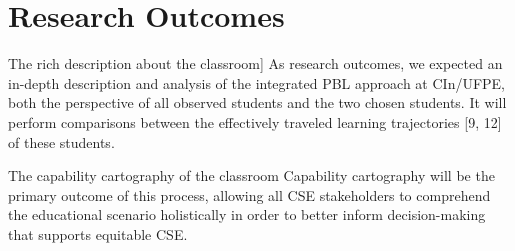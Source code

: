 \section{Research Outcomes}
\label{res-des-sec:outcomes}

{\color{red} The rich description about the classroom] As research outcomes, we expected an in-depth description and analysis of the integrated PBL approach at CIn/UFPE, both the perspective of all observed students and the two chosen students. It will perform comparisons between the effectively traveled learning trajectories [9, 12] of these students.

The capability cartography of the classroom Capability cartography will be the primary outcome of this process, allowing all CSE stakeholders to comprehend the educational scenario holistically in order to better inform decision-making that supports equitable CSE.}
